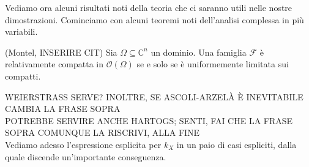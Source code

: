 Vediamo ora alcuni risultati noti della teoria che ci saranno utili nelle nostre dimostrazioni. Cominciamo con alcuni teoremi noti dell'analisi complessa in più variabili.

\begin{thm}
    (Montel, INSERIRE CIT) Sia $\Omega \subseteq \mathbb{C}^n$ un dominio. Una famiglia $\mathcal{F}$ è relativamente compatta in $\mathcal{O}(\Omega)$ se e solo se è uniformemente limitata sui compatti.
\end{thm}

WEIERSTRASS SERVE? INOLTRE, SE ASCOLI-ARZELÀ È INEVITABILE CAMBIA LA FRASE SOPRA\\
POTREBBE SERVIRE ANCHE HARTOGS; SENTI, FAI CHE LA FRASE SOPRA COMUNQUE LA RISCRIVI, ALLA FINE\\

Vediamo adesso l'espressione esplicita per $k_X$ in un paio di casi espliciti, dalla quale discende un'importante conseguenza.

